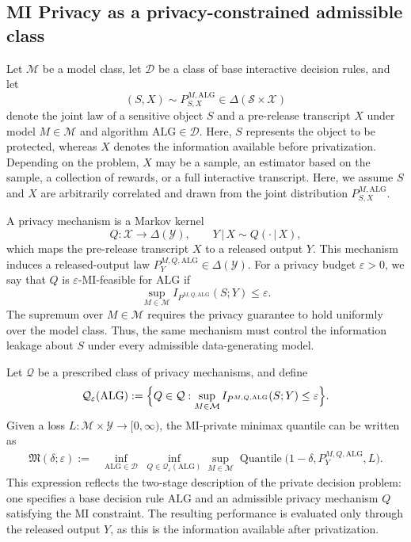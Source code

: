 \documentclass[journal]{IEEEtran}
\newcommand{\ALG}{\mathrm{ALG}}
\newcommand{\Quantile}{\operatorname{Quantile}}
\begin{document}
\subsection{MI Privacy as a privacy-constrained admissible class}

Let \(\mathcal M\) be a model class, let \(\mathcal D\) be a class of base
interactive decision rules, and let
\[
(S,X)\sim P^{M,\ALG}_{S,X}\in\Delta(\mathcal S\times\mathcal X)
\]
denote the joint law of a sensitive object \(S\) and a pre-release transcript
\(X\) under model \(M\in\mathcal M\) and algorithm \(\ALG\in\mathcal D\).
Here, \(S\) represents the object to be protected, whereas \(X\) denotes the
information available before privatization. Depending on the problem, \(X\) may
be a sample, an estimator based on the sample, a collection of rewards, or a
full interactive transcript. Here, we assume \(S\) and \(X\) are arbitrarily
correlated and drawn from the joint distribution \(P^{M,\ALG}_{S,X}\).

A privacy mechanism is a Markov kernel
\[
Q:\mathcal X\to\Delta(\mathcal Y),
\qquad
Y\,|\,X\sim Q(\cdot\,|\,X),
\]
which maps the pre-release transcript \(X\) to a released output \(Y\). This
mechanism induces a released-output law
\(P_Y^{M,Q,\ALG}\in\Delta(\mathcal Y)\). For a privacy budget
\(\varepsilon>0\), we say that \(Q\) is \(\varepsilon\)-MI-feasible for
\(\ALG\) if
\[
\sup_{M\in\mathcal M} I_{P^{M,Q,\ALG}}(S;Y)\le \varepsilon.
\]
The supremum over \(M\in\mathcal M\) requires the privacy guarantee to hold
uniformly over the model class. Thus, the same mechanism must control the
information leakage about \(S\) under every admissible data-generating model.

Let \(\mathcal Q\) be a prescribed class of privacy mechanisms, and define
\[
\mathcal Q_\varepsilon(\ALG)
:=
\Bigl\{
Q\in\mathcal Q:
\sup_{M\in\mathcal M} I_{P^{M,Q,\ALG}}(S;Y)\le \varepsilon
\Bigr\}.
\]
Given a loss \(L:\mathcal M\times\mathcal Y\to[0,\infty)\), the MI-private
minimax quantile can be written as
\begin{align}
\mathfrak M(\delta;\varepsilon)
:={}&
\inf_{\ALG\in\mathcal D}\;
\inf_{Q\in\mathcal Q_\varepsilon(\ALG)}
\sup_{M\in\mathcal M}
\Quantile \bigl(1-\delta,P_Y^{M,Q,\ALG},L\bigr).
\label{eq:mi-private-two-stage}
\end{align}
This expression reflects the two-stage description of the private decision
problem: one specifies a base decision rule \(\ALG\) and an admissible privacy
mechanism \(Q\) satisfying the MI constraint. The resulting performance is
evaluated only through the released output \(Y\), as this is the information
available after privatization.
\end{document}
